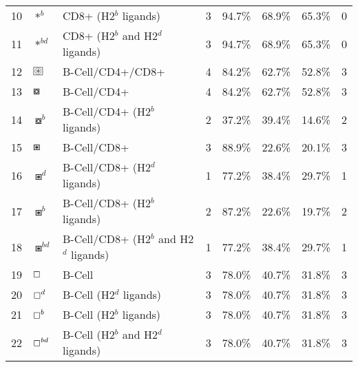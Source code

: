 \begin{tabular}{rllccccc}
10 &                                           $ \ast^b $ &                    CD8+ (H2$^b$ ligands) &            3 &         94.7\% &          68.9\% &         65.3\% &                          0 \\
11 &                                        $ \ast^{bd} $ &         CD8+ (H2$^b$ and H2$^d$ ligands) &            3 &         94.7\% &          68.9\% &         65.3\% &                          0 \\
12 &  $ \setlength{\fboxsep}{0.5pt} \boxed{\circledast} $ &                         B-Cell/CD4+/CD8+ &            4 &         84.2\% &          62.7\% &         52.8\% &                          3 \\
13 &                                       $ \boxcircle $ &                              B-Cell/CD4+ &            4 &         84.2\% &          62.7\% &         52.8\% &                          3 \\
14 &                                     $ \boxcircle^b $ &             B-Cell/CD4+ (H2$^b$ ligands) &            2 &         37.2\% &          39.4\% &         14.6\% &                          2 \\
15 &                                          $ \boxast $ &                              B-Cell/CD8+ &            3 &         88.9\% &          22.6\% &         20.1\% &                          3 \\
16 &                                        $ \boxast^d $ &             B-Cell/CD8+ (H2$^d$ ligands) &            1 &         77.2\% &          38.4\% &         29.7\% &                          1 \\
17 &                                        $ \boxast^b $ &             B-Cell/CD8+ (H2$^b$ ligands) &            2 &         87.2\% &          22.6\% &         19.7\% &                          2 \\
18 &                                     $ \boxast^{bd} $ &  B-Cell/CD8+ (H2$^b$ and H2$^d$ ligands) &            1 &         77.2\% &          38.4\% &         29.7\% &                          1 \\
19 &                                        $ \boxempty $ &                                   B-Cell &            3 &         78.0\% &          40.7\% &         31.8\% &                          3 \\
20 &                                      $ \boxempty^d $ &                  B-Cell (H2$^d$ ligands) &            3 &         78.0\% &          40.7\% &         31.8\% &                          3 \\
21 &                                      $ \boxempty^b $ &                  B-Cell (H2$^b$ ligands) &            3 &         78.0\% &          40.7\% &         31.8\% &                          3 \\
22 &                                   $ \boxempty^{bd} $ &       B-Cell (H2$^b$ and H2$^d$ ligands) &            3 &         78.0\% &          40.7\% &         31.8\% &                          3 \\
\bottomrule
\end{tabular}
